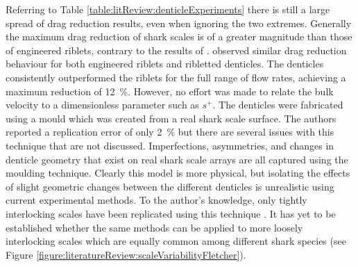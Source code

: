 \documentclass[12pt,oneside,a4paper]{article}
\begin{document}
Referring to Table \ref{table:litReview:denticleExperiments} there is still a large spread of drag reduction results, even when ignoring the two extremes. %
Generally the maximum drag reduction of shark scales is of a greater magnitude than those of engineered riblets, contrary to the results of \cite{bechert1985}. \cite{chen2014} observed similar drag reduction behaviour for both engineered riblets and ribletted denticles.
The denticles consistently outperformed the riblets for the full range of flow rates, achieving a maximum reduction of \SI{12}{\%}. However, no effort was made to relate the bulk velocity to a dimensionless parameter such as $s^+$. The denticles were fabricated using a mould which was created from a real shark scale surface. The authors reported a replication error of only \SI{2}{\%} but there are several issues with this technique that are not discussed. Imperfections, asymmetries, and changes in denticle geometry that exist on real shark scale arrays are all captured using the moulding technique. Clearly this model is more physical, but isolating the effects of slight geometric changes between the different denticles is unrealistic using current experimental methods. To the author's knowledge, only tightly interlocking scales have been replicated using this technique \citep{zhang2011a,zhang2011b, zhao2012, chen2014,luo2015b,luo2015}. It has yet to be established whether the same methods can be applied to more loosely interlocking scales which are equally common among different shark species (see Figure \ref{figure:literatureReview:scaleVariabilityFletcher}).
\end{document}
